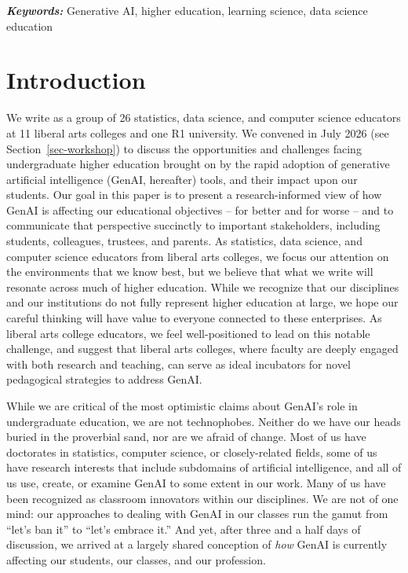 \documentclass[
]{hdsr}
\begin{document}
\vspace*{0.15in}

\hspace{10pt}
  \small	
  \textbf{\textit{Keywords: }} Generative AI, higher education, learning
science, data science education

\copyrightnotice


\section{Introduction}\label{introduction}

We write as a group of 26 statistics, data science, and computer science
educators at 11 liberal arts colleges and one R1 university. We convened
in July 2026 (see Section~\ref{sec-workshop}) to discuss the
opportunities and challenges facing undergraduate higher education
brought on by the rapid adoption of generative artificial intelligence
(GenAI, hereafter) tools, and their impact upon our students. Our goal
in this paper is to present a research-informed view of how GenAI is
affecting our educational objectives -- for better and for worse -- and
to communicate that perspective succinctly to important stakeholders,
including students, colleagues, trustees, and parents. As statistics,
data science, and computer science educators from liberal arts colleges,
we focus our attention on the environments that we know best, but we
believe that what we write will resonate across much of higher
education. While we recognize that our disciplines and our institutions
do not fully represent higher education at large, we hope our careful
thinking will have value to everyone connected to these enterprises. As
liberal arts college educators, we feel well-positioned to lead on this
notable challenge, and suggest that liberal arts colleges, where faculty
are deeply engaged with both research and teaching, can serve as ideal
incubators for novel pedagogical strategies to address GenAI.

While we are critical of the most optimistic claims about GenAI's role
in undergraduate education, we are not technophobes. Neither do we have
our heads buried in the proverbial sand, nor are we afraid of change.
Most of us have doctorates in statistics, computer science, or
closely-related fields, some of us have research interests that include
subdomains of artificial intelligence, and all of us use, create, or
examine GenAI to some extent in our work. Many of us have been
recognized as classroom innovators within our disciplines. We are not of
one mind: our approaches to dealing with GenAI in our classes run the
gamut from ``let's ban it'' to ``let's embrace it.'' And yet, after
three and a half days of discussion, we arrived at a largely shared
conception of \emph{how} GenAI is currently affecting our students, our
classes, and our profession.
\end{document}
